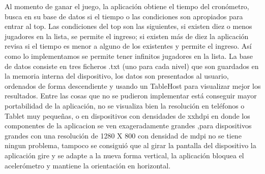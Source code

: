 \documentclass[11pt]{article} %
\begin{document}
Al momento de ganar el juego, la aplicación obtiene el tiempo del cronómetro, busca en su base de datos si el tiempo o las condiciones son apropiados para entrar al top. Las condiciones del top son las siguientes, si existen diez o menos jugadores en la lista, se permite el ingreso; si existen más de diez la aplicación revisa si el tiempo es menor a alguno de los existentes y permite el ingreso.  Así como lo implementamos se permite tener infinitos jugadores en la lista.
La base de datos consiste en tres  ficheros .txt (uno para cada nivel) que son guardados en la memoria interna del dispositivo, los datos son presentados al usuario, ordenados de forma descendiente y usando un TableHost para visualizar mejor los resultados.
Entre las cosas que no se pudieron implementar está conseguir mayor portabilidad de la aplicación, no se visualiza bien la resolución en teléfonos o Tablet muy pequeñas, o en dispositivos con densidades de xxhdpi en donde los componentes de la aplicacion se ven exageradamente grandes ,para dispositivos grandes con una resolución de 1280 X 800 con densidad de mdpi no se tiene ningun problema, tampoco se consiguió que al girar la pantalla del dispositivo la aplicación gire y se adapte a la nueva forma vertical, la aplicación bloquea el acelerómetro y mantiene la orientación en horizontal. 
\end{document}

